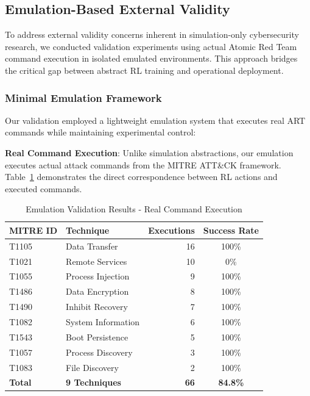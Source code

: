 
\subsection{Emulation-Based External Validity}

To address external validity concerns inherent in simulation-only cybersecurity research, we conducted validation experiments using actual Atomic Red Team command execution in isolated emulated environments. This approach bridges the critical gap between abstract RL training and operational deployment.

\subsubsection{Minimal Emulation Framework}

Our validation employed a lightweight emulation system that executes real ART commands while maintaining experimental control:

\textbf{Real Command Execution}: Unlike simulation abstractions, our emulation executes actual attack commands from the MITRE ATT\&CK framework. Table~\ref{tab:emulation_validation} demonstrates the direct correspondence between RL actions and executed commands.

\begin{table}[H]
\centering
\caption{Emulation Validation Results - Real Command Execution}
\label{tab:emulation_validation}
\begin{tabular}{llrc}
\toprule
\textbf{MITRE ID} & \textbf{Technique} & \textbf{Executions} & \textbf{Success Rate} \\
\midrule
T1105 & Data Transfer & 16 & 100\% \\
T1021 & Remote Services & 10 & 0\% \\
T1055 & Process Injection & 9 & 100\% \\
T1486 & Data Encryption & 8 & 100\% \\
T1490 & Inhibit Recovery & 7 & 100\% \\
T1082 & System Information & 6 & 100\% \\
T1543 & Boot Persistence & 5 & 100\% \\
T1057 & Process Discovery & 3 & 100\% \\
T1083 & File Discovery & 2 & 100\% \\
\midrule
\textbf{Total} & \textbf{9 Techniques} & \textbf{66} & \textbf{84.8\%} \\
\bottomrule
\end{tabular}
\end{table}

